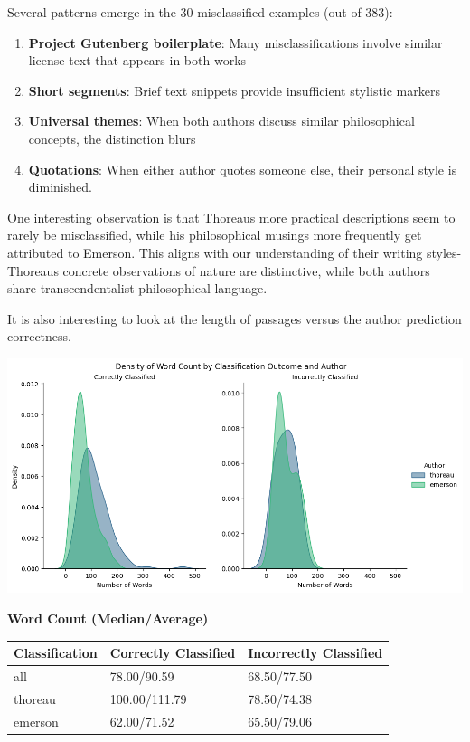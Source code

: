 \documentclass[
]{article}
\begin{document}
Several patterns emerge in the 30 misclassified examples (out of 383):

\begin{enumerate}
\def\labelenumi{\arabic{enumi}.}
\item
  \textbf{Project Gutenberg boilerplate}: Many misclassifications
  involve similar license text that appears in both works
\item
  \textbf{Short segments}: Brief text snippets provide insufficient
  stylistic markers
\item
  \textbf{Universal themes}: When both authors discuss similar
  philosophical concepts, the distinction blurs
\item
  \textbf{Quotations}: When either author quotes someone else, their
  personal style is diminished.
\end{enumerate}

One interesting observation is that Thoreau\textquotesingle s more
practical descriptions seem to rarely be misclassified, while his philosophical
musings more frequently get attributed to Emerson. This aligns with our
understanding of their writing styles-Thoreau\textquotesingle s
concrete observations of nature are distinctive, while both authors
share transcendentalist philosophical language.

It is also interesting to look at the length of passages versus the
author prediction correctness.

\includegraphics{density_plots.png}

\textbf{Word Count (Median/Average)}

\begin{longtable}[]{@{}lll@{}}
\toprule\noalign{}
Classification & Correctly Classified & Incorrectly Classified \\
\midrule\noalign{}
\endhead
\bottomrule\noalign{}
\endlastfoot
all & 78.00/90.59 & 68.50/77.50 \\
thoreau & 100.00/111.79 & 78.50/74.38 \\
emerson & 62.00/71.52 & 65.50/79.06 \\
\end{longtable}
\end{document}
